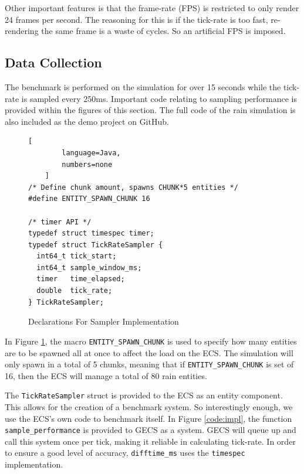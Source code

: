 Other important features is that the frame-rate (FPS) is restricted to only render 24 frames per second. The reasoning for this is if the tick-rate is too fast, re-rendering the same frame is a waste of cycles. So an artificial FPS is imposed.

\subsection{Data Collection}
The benchmark is performed on the simulation for over 15 seconds while the tick-rate is sampled every 250ms. Important code relating to sampling performance is provided within the figures of this section. The full code of the rain simulation is also included as the demo project on GitHub. 

\begin{figure}[htbp]
    \begin{lstlisting}[
        language=Java,
        numbers=none
    ]
/* Define chunk amount, spawns CHUNK*5 entities */
#define ENTITY_SPAWN_CHUNK 16

/* timer API */
typedef struct timespec timer;
typedef struct TickRateSampler {
  int64_t tick_start;
  int64_t sample_window_ms;
  timer   time_elapsed;
  double  tick_rate;
} TickRateSampler;
    \end{lstlisting}
    \caption{Declarations For Sampler Implementation}
    \label{code:sampler}
\end{figure}

In Figure \ref{code:sampler}, the macro \texttt{ENTITY\_SPAWN\_CHUNK} is used to specify how many entities are to be spawned all at once to affect the load on the ECS. The simulation will only spawn in a total of 5 chunks, meaning that if \texttt{ENTITY\_SPAWN\_CHUNK} is set of 16, then the ECS will manage a total of 80 rain entities. 

The \texttt{TickRateSampler} struct is provided to the ECS as an entity component. This allows for the creation of a benchmark system. So interestingly enough, we use the ECS's own code to benchmark itself. In Figure \ref{code:impl}, the function \texttt{sample\_performance} is provided to GECS as a system. GECS will queue up and call this system once per tick, making it reliable in calculating tick-rate. In order to ensure a good level of accuracy, \texttt{difftime\_ms} uses the \texttt{timespec} implementation.

